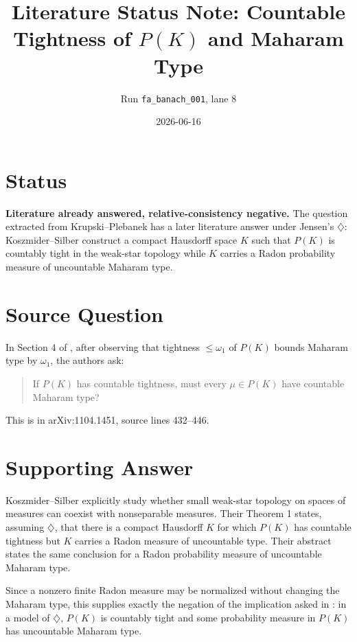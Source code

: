 \documentclass[11pt]{article}
\title{Literature Status Note: Countable Tightness of \(P(K)\) and Maharam Type}
\author{Run \texttt{fa\_banach\_001}, lane 8}
\date{2026-06-16}
\begin{document}
\maketitle

\section*{Status}

\textbf{Literature already answered, relative-consistency negative.}
The question extracted from Krupski--Plebanek \cite{KP} has a later
literature answer under Jensen's \(\diamondsuit\): Koszmider--Silber
\cite[Theorem 1]{KS} construct a compact Hausdorff space \(K\) such
that \(P(K)\) is countably tight in the weak-star topology while \(K\)
carries a Radon probability measure of uncountable Maharam type.

\section*{Source Question}

In Section 4 of \cite{KP}, after observing that tightness
\(\leq\omega_1\) of \(P(K)\) bounds Maharam type by \(\omega_1\), the
authors ask:

\begin{quote}
If \(P(K)\) has countable tightness, must every \(\mu\in P(K)\) have
countable Maharam type?
\end{quote}

This is in arXiv:1104.1451, source lines 432--446.

\section*{Supporting Answer}

Koszmider--Silber \cite{KS} explicitly study whether small weak-star
topology on spaces of measures can coexist with nonseparable measures.
Their Theorem 1 states, assuming \(\diamondsuit\), that there is a
compact Hausdorff \(K\) for which \(P(K)\) has countable tightness but
\(K\) carries a Radon measure of uncountable type. Their abstract states
the same conclusion for a Radon probability measure of uncountable
Maharam type.

Since a nonzero finite Radon measure may be normalized without changing
the Maharam type, this supplies exactly the negation of the implication
asked in \cite{KP}: in a model of \(\diamondsuit\), \(P(K)\) is
countably tight and some probability measure in \(P(K)\) has
uncountable Maharam type.
\end{document}
